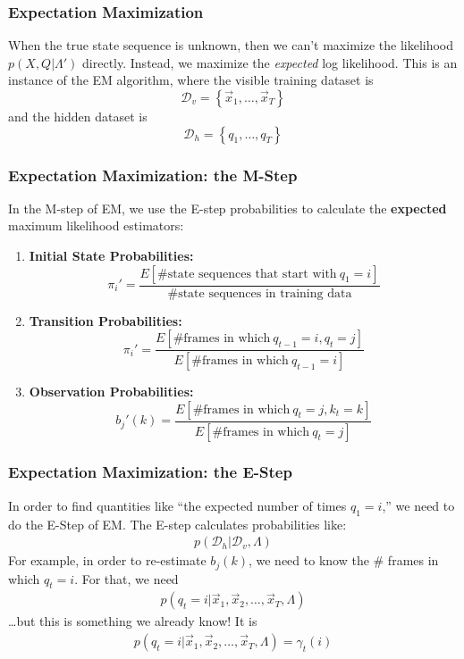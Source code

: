 \documentclass{beamer}
\begin{document}
\begin{frame}
  \frametitle{Expectation Maximization}

  When the true state sequence is unknown, then we can't maximize the
  likelihood $p(X,Q|\Lambda')$ directly.  Instead, we maximize the {\em
    expected} log likelihood.  This is an instance of the EM algorithm, where
  the visible training dataset is
  \begin{displaymath}
    {\mathcal D}_v = \left\{\vec{x}_1,\ldots,\vec{x}_T\right\}
  \end{displaymath}
  and the hidden dataset is
  \begin{displaymath}
    {\mathcal D}_h = \left\{q_1,\ldots,q_T\right\}
  \end{displaymath}
\end{frame}

\begin{frame}
  \frametitle{Expectation Maximization: the M-Step}

  In the M-step of EM, we use the E-step probabilities to calculate
  the {\bf expected} maximum likelihood estimators:
  \begin{enumerate}
  \item {\bf Initial State Probabilities:}
    \[
    \pi_i'=\frac{E\left[\mbox{\# state sequences that start with}~q_1=i\right]}{\mbox{\# state sequences in training data}}
    \]
  \item {\bf Transition Probabilities:}
    \[
    \pi_i'=\frac{E\left[\mbox{\# frames in which}~q_{t-1}=i,q_t=j\right]}{E\left[\mbox{\# frames in which}~q_{t-1}=i\right]}
    \]
  \item {\bf Observation Probabilities:} 
    \[
    b_j'(k)=\frac{E\left[\mbox{\# frames in which}~q_t=j,k_t=k\right]}{E\left[\mbox{\# frames in which}~q_{t}=j\right]}
    \]
  \end{enumerate}
\end{frame}


\begin{frame}
  \frametitle{Expectation Maximization: the E-Step}

  In order to find quantities like ``the expected number of times $q_1=i$,'' we need to
  do the E-Step of EM.  The E-step calculates probabilities like:
  \begin{align*}
    p({\mathcal D}_h|{\mathcal D}_v,\Lambda)
  \end{align*}
  For example, in order to re-estimate $b_j(k)$, we need to know the
  \# frames in which $q_t=i$. For that, we need
  \begin{align*}
    p(q_t=i|\vec{x}_1,\vec{x}_2,\ldots,\vec{x}_T,\Lambda)
  \end{align*}
  \ldots but this is something we already know!  It is
  \begin{align*}
    p(q_t=i|\vec{x}_1,\vec{x}_2,\ldots,\vec{x}_T,\Lambda) = \gamma_t(i)
  \end{align*}  
\end{frame}
\end{document}
